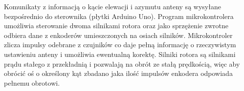Komunikaty z informacją o kącie elewacji i azymutu anteny są wysyłane bezpośrednio do sterownika (płytki Arduino Uno). Program mikrokontrolera umożliwia sterowanie dwoma silnikami rotora oraz jako sprzężenie zwrotne odbiera dane z enkoderów umieszczonych na osiach silników. Mikrokontroler zlicza impulsy odebrane z czujników co daje pełną informację o rzeczywistym ustawieniu anteny i umożliwia ewentualną korektę. Silniki rotora są silnikami prądu stałego z przekładnią i pozwalają na obrót ze stałą prędkością, więc aby obrócić oś o określony kąt zbadano jaka ilość impulsów enkodera odpowiada pełnemu obrotowi. 
